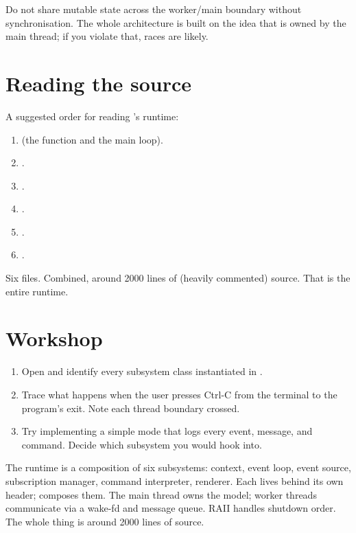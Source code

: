 \begin{warning}
Do not share mutable state across the worker/main boundary
without synchronisation. The whole architecture is built on the
idea that  is owned by the main thread; if you
violate that, races are likely.
\end{warning}

\section{Reading the source}

A suggested order for reading \maya{}'s runtime:

\begin{enumerate}[leftmargin=*]
  \item {} (the 
    function and the main loop).
  \item {}.
  \item {}.
  \item {}.
  \item {}.
  \item {}.
\end{enumerate}

Six files. Combined, around 2000 lines of (heavily commented)
source. That is the entire runtime.

\section*{Workshop}

\begin{enumerate}[leftmargin=*]
  \item Open  and identify
    every subsystem class instantiated in .
  \item Trace what happens when the user presses Ctrl-C from
    the terminal to the program's exit. Note each thread
    boundary crossed.
  \item Try implementing a simple mode that
    logs every event, message, and command. Decide which
    subsystem you would hook into.
\end{enumerate}

\begin{recap}
The runtime is a composition of six subsystems: context, event
loop, event source, subscription manager, command interpreter,
renderer. Each lives behind its own header;  composes
them. The main thread owns the model; worker threads communicate
via a wake-fd and message queue. RAII handles shutdown order.
The whole thing is around 2000 lines of source.
\end{recap}
